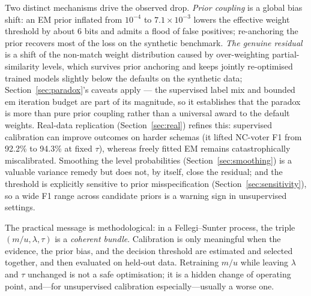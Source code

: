 \documentclass[11pt]{article}
\begin{document}
Two distinct mechanisms drive the observed drop. \emph{Prior coupling} is a global bias
shift: an EM prior inflated from $10^{-4}$ to $7.1\times10^{-3}$ lowers the effective weight
threshold by about $6$ bits and admits a flood of false positives; re-anchoring the prior
recovers most of the loss on the synthetic benchmark. \emph{The genuine residual} is a shift
of the non-match weight distribution caused by over-weighting partial-similarity levels,
which survives prior anchoring and keeps jointly re-optimised trained models slightly below
the defaults on the synthetic data; Section~\ref{sec:paradox}'s caveats apply --- the
supervised label mix and bounded em iteration budget are part of its magnitude, so it
establishes that the paradox is more than pure prior coupling rather than a universal award
to the default weights. Real-data replication (Section~\ref{sec:real}) refines
this: supervised calibration can improve outcomes on harder schemas (it lifted NC-voter F1
from 92.2\% to 94.3\% at fixed $\tau$), whereas freely fitted EM remains catastrophically
miscalibrated. Smoothing the level probabilities (Section~\ref{sec:smoothing}) is a
valuable variance remedy but does not, by itself, close the residual; and the threshold is
explicitly sensitive to prior misspecification (Section~\ref{sec:sensitivity}), so a wide
F1 range across candidate priors is a warning sign in unsupervised settings.

The practical message is methodological: in a Fellegi--Sunter process, the triple
$(m/u,\lambda,\tau)$ is a \emph{coherent bundle}. Calibration is only meaningful when the
evidence, the prior bias, and the decision threshold are estimated and selected together,
and then evaluated on held-out data. Retraining $m/u$ while leaving $\lambda$ and $\tau$
unchanged is not a safe optimisation; it is a hidden change of operating point, and---for
unsupervised calibration especially---usually a worse one.
\end{document}
